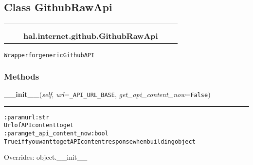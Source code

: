 
\subsection{Class GithubRawApi}

    \label{hal:internet:github:GithubRawApi}
\begin{tabular}{cccccc}
\multicolumn{2}{r}{\settowidth{\BCL}{object}\multirow{2}{\BCL}{object}}
&&
  \\\cline{3-3}
  &&\multicolumn{1}{c|}{}
&&
  \\
&&\multicolumn{2}{l}{\textbf{hal.internet.github.GithubRawApi}}
\end{tabular}

\begin{alltt}
Wrapper for generic Github API 
\end{alltt}



  \subsubsection{Methods}

    \vspace{0.5ex}

\hspace{.8\funcindent}\begin{boxedminipage}{\funcwidth}

    \raggedright \textbf{\_\_init\_\_}(\textit{self}, \textit{url}={\tt \_API\_URL\_BASE}, \textit{get\_api\_content\_now}={\tt False})

    \vspace{-1.5ex}

    \rule{\textwidth}{0.5\fboxrule}
\setlength{\parskip}{2ex}
\begin{alltt}

:param url: str
    Url of API content to get
:param get\_api\_content\_now: bool
    True iff you want to get API content response when building object
\end{alltt}

\setlength{\parskip}{1ex}
      Overrides: object.\_\_init\_\_

    \end{boxedminipage}

